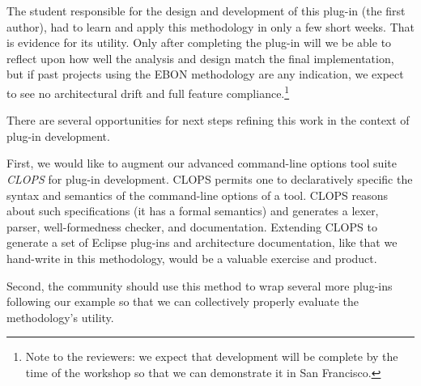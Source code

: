 \documentclass[conference]{IEEEtran}
\begin{document}
The student responsible for the design and development of this plug-in
(the first author), had to learn and apply this methodology in only a
few short weeks.  That is evidence for its utility.  Only after
completing the plug-in will we be able to reflect upon how well the
analysis and design match the final implementation, but if past
projects using the EBON methodology are any indication, we expect to
see no architectural drift and full feature compliance.\footnote{Note
  to the reviewers: we expect that development will be complete by the
  time of the workshop so that we can demonstrate it in San Francisco.}

There are several opportunities for next steps refining this work in
the context of plug-in development.  

First, we would like to augment our advanced command-line options tool
suite \emph{CLOPS} for plug-in development.  CLOPS permits one to
declaratively specific the syntax and semantics of the command-line
options of a tool.  CLOPS reasons about such specifications (it has a
formal semantics) and generates a lexer, parser, well-formedness
checker, and documentation.  Extending CLOPS to generate a set of
Eclipse plug-ins and architecture documentation, like that we
hand-write in this methodology, would be a valuable exercise and
product.

Second, the community should use this method to wrap several more
plug-ins following our example so that we can collectively properly
evaluate the methodology's utility.






%
%
%
%





\end{document}
